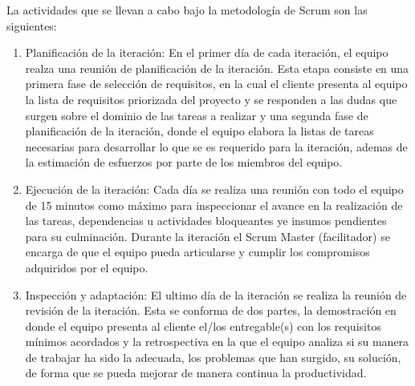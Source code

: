 La actividades que se llevan a cabo bajo la metodología de Scrum son las siguientes:

\begin{enumerate}
\item Planificación de la iteración: En el primer día de cada iteración, el equipo realza una reunión de planificación de la iteración. Esta etapa consiste en una primera fase de selección de requisitos, en la cual el cliente presenta al equipo la lista de requisitos priorizada del proyecto y se responden a las dudas que surgen sobre el dominio de las tareas a realizar y una segunda fase de planificación de la iteración, donde el equipo elabora la listas de tareas necesarias para desarrollar lo que se es requerido para la iteración, ademas de la estimación de esfuerzos por parte de los miembros del equipo.
\item Ejecución de la iteración: Cada día se realiza una reunión con todo el equipo de 15 minutos como máximo para inspeccionar el avance en la realización de las tareas, dependencias u actividades bloqueantes ye insumos pendientes para su culminación. Durante la iteración el Scrum Master (facilitador) se encarga de que el equipo pueda articularse y cumplir los compromisos adquiridos por el equipo.
\item Inspección y adaptación: El ultimo día de la iteración se realiza la reunión de revisión de la iteración. Esta se conforma de dos partes, la demostración en donde el equipo presenta al cliente el/los entregable(s) con los requisitos mínimos acordados y la retrospectiva en la que el equipo analiza si su manera de trabajar ha sido la adecuada, los problemas que han surgido, su solución, de forma que se pueda mejorar de manera continua la productividad.
\end{enumerate}